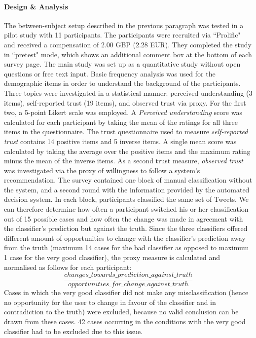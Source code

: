 \paragraph{Design \& Analysis}
The between-subject setup described in the previous paragraph was tested in a pilot study with 11 participants. The participants were recruited via ``Prolific" and received a compensation of 2.00 GBP (2.28 EUR). They completed the study in ``pretest" mode, which shows an additional comment box at the bottom of each survey page.\newline
The main study was set up as a quantitative study without open questions or free text input. Basic frequency analysis was used for the demographic items in order to understand the background of the participants. Three topics were investigated in a statistical manner: perceived understanding (3 items), self-reported trust (19 items), and observed trust via proxy. For the first two, a 5-point Likert scale was employed.\newline
A \textit{Perceived understanding} score was calculated for each participant by taking the mean of the ratings for all three items in the questionnaire. The trust questionnaire used to measure \textit{self-reported trust} contains 14 positive items and 5 inverse items. A single mean score was calculated by taking the average over the positive items and the maximum rating minus the mean of the inverse items. As a second trust measure, \textit{observed trust} was investigated via the proxy of willingness to follow a system's recommendation. The survey contained one block of manual classification without the system, and a second round with the information provided by the automated decision system. In each block, participants classified the same set of Tweets. We can therefore determine how often a participant switched his or her classification out of 15 possible cases and how often the change was made in agreement with the classifier's prediction but against the truth. Since the three classifiers offered different amount of opportunities to change with the classifier's prediction away from the truth (maximum 14 cases for the bad classifier as opposed to maximum 1 case for the very good classifier), the proxy measure is calculated and normalised as follows for each participant:
\[ \frac{changes\_towards\_prediction\_against\_truth}{opportunities\_for\_change\_against\_truth} \]
Cases in which the very good classifier did not make any misclassification (hence no opportunity for the user to change in favour of the classifier and in contradiction to the truth) were excluded, because no valid conclusion can be drawn from these cases. 42 cases occurring in the conditions with the very good classifier had to be excluded due to this issue.\newline
